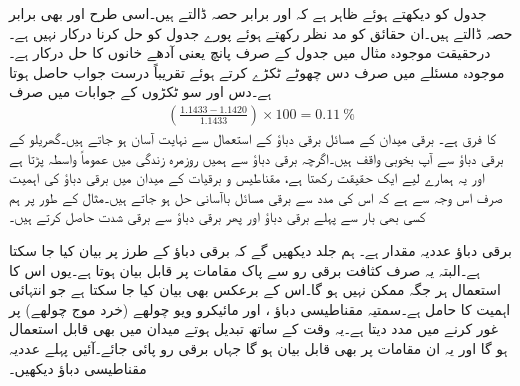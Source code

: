 جدول کو دیکھتے ہوئے ظاہر ہے کہ  اور  برابر حصہ ڈالتے ہیں۔اسی طرح  اور  بھی برابر حصہ ڈالتے ہیں۔ان حقائق کو مد نظر رکھتے ہوئے پورے جدول کو حل کرنا درکار نہیں ہے۔درحقیقت موجودہ مثال میں جدول کے صرف پانچ یعنی آدھے خانوں  کا حل درکار ہے۔موجودہ مسئلے میں صرف دس چھوٹے ٹکڑے کرتے ہوئے تقریباً درست جواب حاصل ہوتا ہے۔دس اور سو ٹکڑوں کے جوابات میں صرف
\begin{align*}
\left(\frac{1.1433-1.1420}{1.1433}\right)\times 100=\SI{0.11}{\percent} 
\end{align*}
کا فرق ہے۔
برقی میدان کے مسائل برقی دباؤ کے استعمال سے نہایت آسان ہو جاتے ہیں۔گھریلو  کے برقی دباؤ سے آپ بخوبی واقف ہیں۔اگرچہ برقی دباؤ سے ہمیں روزمرہ زندگی میں عموماً واسطہ پڑتا ہے اور یہ ہمارے لیے ایک حقیقت رکھتا ہے، مقناطیس و برقیات کے میدان میں برقی دباؤ کی اہمیت صرف اس وجہ سے ہے کہ اس کی مدد سے برقی مسائل باآسانی حل ہو جاتے ہیں۔مثال کے طور پر ہم کسی بھی بار سے پہلے برقی دباؤ اور پھر برقی دباؤ سے برقی شدت حاصل کرتے ہیں۔

برقی دباؤ عددیہ مقدار ہے۔ ہم جلد دیکھیں گے کہ برقی دباؤ کے طرز پر  بیان کیا جا سکتا ہے۔البتہ یہ صرف کثافت برقی رو سے پاک مقامات پر قابل بیان ہوتا ہے۔یوں اس کا استعمال ہر جگہ ممکن نہیں ہو گا۔اس کے برعکس  بھی بیان کیا جا سکتا ہے جو انتہائی اہمیت کا حامل ہے۔سمتیہ مقناطیسی دباؤ ،  اور مائیکرو ویو چولھے (خرد موج چولھے) پر غور کرنے میں مدد دیتا ہے۔یہ وقت کے ساتھ تبدیل ہوتے میدان میں بھی قابل استعمال ہو گا اور یہ ان مقامات پر بھی قابل بیان ہو گا جہاں برقی رو پائی جائے۔آئیں پہلے عددیہ مقناطیسی دباؤ دیکھیں۔


